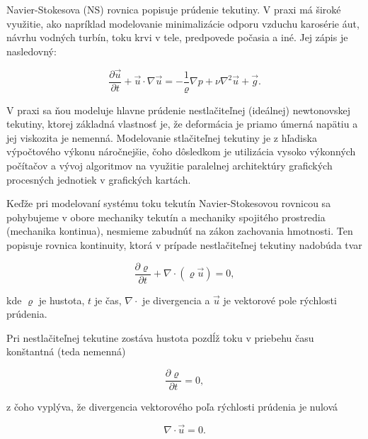 \documentclass[]{tukediphc}
\begin{document}
Navier-Stokesova (NS) rovnica popisuje prúdenie tekutiny. V praxi má široké využitie, ako napríklad modelovanie minimalizácie odporu vzduchu karosérie áut, návrhu vodných turbín, toku krvi v tele, predpovede počasia a iné. Jej zápis je nasledovný:

\begin{equation}
\frac{\partial \vec{u}}{\partial t} + \vec{u} \cdot \nabla \vec{u} = - \frac{1}{\varrho} \nabla p + \nu \nabla^2 \vec{u} + \vec{g}.
\end{equation}

V praxi sa ňou modeluje hlavne prúdenie nestlačiteľnej (ideálnej) newtonovskej tekutiny, ktorej základná vlastnosť je, že deformácia je priamo úmerná napätiu a jej viskozita je nemenná. Modelovanie stlačiteľnej tekutiny je z hľadiska výpočtového výkonu náročnejšie, čoho dôsledkom je utilizácia vysoko výkonných počítačov a vývoj algoritmov na využitie paralelnej architektúry grafických procesných jednotiek v grafických kartách.

Keďže pri modelovaní systému toku tekutín Navier-Stokesovou rovnicou sa pohybujeme v obore mechaniky tekutín a mechaniky spojitého prostredia (mechanika kontinua), nesmieme zabudnúť na zákon zachovania hmotnosti. Ten popisuje rovnica kontinuity, ktorá v prípade nestlačiteľnej tekutiny nadobúda tvar

\begin{equation}
\frac{\partial \varrho}{\partial t} + \nabla \cdot (\varrho \vec{u}) = 0, 
\end{equation}

kde $\varrho$  je hustota, $t$ je čas, $\nabla \cdot$ je divergencia a $\vec{u}$ je vektorové pole rýchlosti prúdenia.

Pri nestlačiteľnej tekutine zostáva hustota pozdĺž toku v priebehu času konštantná (teda nemenná)

\begin{equation}
\frac{\partial \varrho}{\partial t} = 0, 
\end{equation}

z čoho vyplýva, že divergencia vektorového poľa rýchlosti prúdenia je nulová

\begin{equation}
\nabla \cdot \vec{u} = 0.
\end{equation}
\end{document}
